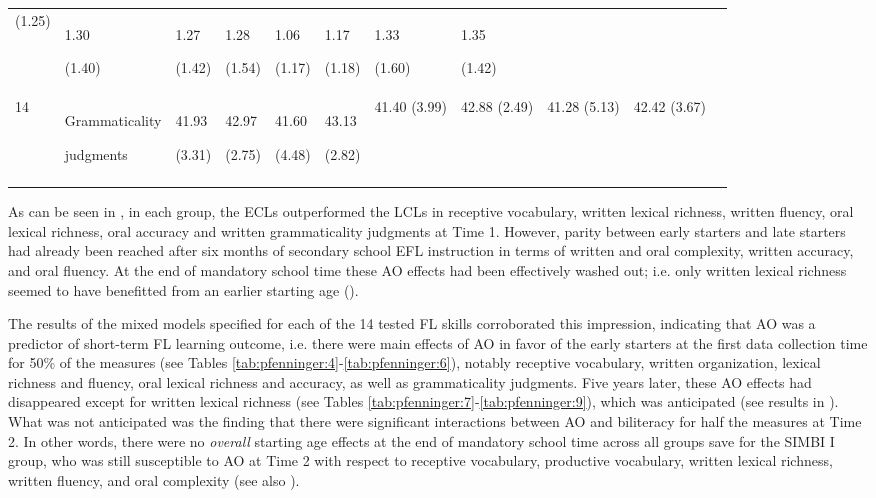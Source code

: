 \documentclass[output=paper,modfonts,nonflat,newtxmath]{langsci/langscibook}
\begin{document}
\begin{table}
{\begin{tabularx}{\textwidth}{l p{4cm} YYYYYYYYY}
 (1.25) & { 1.30}

 (1.40) & { 1.27}

 (1.42) & { 1.28}

 (1.54) & { 1.06}

 (1.17) & { 1.17}

 (1.18) & { 1.33}

 (1.60) & { 1.35}

 (1.42)\\
 14 & Grammaticality

judgments & { 41.93}

 (3.31) & { 42.97}

 (2.75) & { 41.60}

 (4.48) & { 43.13}

 (2.82) & { 41.40} (3.99) & { 42.88} (2.49) & { 41.28} (5.13) & { 42.42} (3.67)\\
\lspbottomrule
\end{tabularx}
}

\end{table}

As can be seen in , in each group, the ECLs outperformed the LCLs in receptive vocabulary, written lexical richness, written fluency, oral lexical richness, oral accuracy and written grammaticality judgments at Time 1. However, parity between early starters and late starters had already been reached after six months of secondary school EFL instruction in terms of written and oral complexity, written accuracy, and oral fluency. At the end of mandatory school time these AO effects had been effectively washed out; i.e. only written lexical richness seemed to have benefitted from an earlier starting age ().

The results of the mixed models specified for each of the 14 tested FL skills corroborated this impression, indicating that AO was a predictor of short-term FL learning outcome, i.e. there were main effects of AO in favor of the early starters at the first data collection time for 50\% of the measures (see Tables \ref{tab:pfenninger:4}-\ref{tab:pfenninger:6}), notably receptive vocabulary, written organization, lexical richness and fluency, oral lexical richness and accuracy, as well as grammaticality judgments. Five years later, these AO effects had disappeared except for written lexical richness (see Tables \ref{tab:pfenninger:7}-\ref{tab:pfenninger:9}), which was anticipated (see results in \citealt{Authors2017}). What was not anticipated was the finding that there were significant interactions between AO and biliteracy for half the measures at Time 2. In other words, there were no \textit{overall} starting age effects at the end of mandatory school time across all groups save for the SIMBI I group, who was still susceptible to AO at Time 2 with respect to receptive vocabulary, productive vocabulary, written lexical richness, written fluency, and oral complexity (see also \citealt{PfenningerSingleton2019}).
\end{document}
